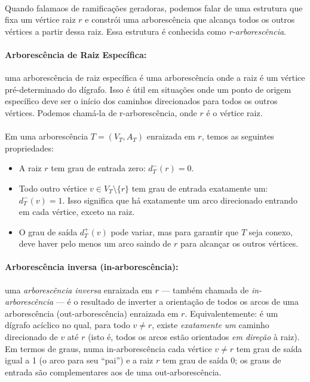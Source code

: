 \documentclass[12pt,a4paper]{article}
\begin{document}
\paragraph{}
Quando falamaos de ramificações geradoras, podemos falar de uma estrutura que fixa um vértice raiz \(r\) e constrói uma arborescência que alcança todos os outros vértices a partir dessa raiz. Essa estrutura é conhecida como \emph{r-arborescência}.

\paragraph{Arborescência de Raiz Específica:}
uma arborescência de raiz específica é uma arborescência onde a raiz é um vértice pré-determinado do dígrafo. Isso é útil em situações onde um ponto de origem específico deve ser o início dos caminhos direcionados para todos os outros vértices. Podemos chamá-la de r-arborescência, onde \(r\) é o vértice raiz.

\paragraph{}
Em uma arborescência \(T = (V_T, A_T)\) enraizada em \(r\), temos as seguintes propriedades:
\begin{itemize}
    \item A raiz \(r\) tem grau de entrada zero: \(d_T^-(r) = 0\).
    \item Todo outro vértice \(v \in V_T \setminus \{r\}\) tem grau de entrada exatamente um: \(d_T^-(v) = 1\). Isso significa que há exatamente um arco direcionado entrando em cada vértice, exceto na raiz.
    \item O grau de saída \(d_T^+(v)\) pode variar, mas para garantir que \(T\) seja conexo, deve haver pelo menos um arco saindo de \(r\) para alcançar os outros vértices.
\end{itemize}

\paragraph{Arborescência inversa (in-arborescência):}
uma \emph{arborescência inversa} enraizada em \(r\) — também chamada de \emph{in-arborescência} — é o resultado de inverter a orientação de todos os arcos de uma arborescência (out-arborescência) enraizada em \(r\). Equivalentemente: é um dígrafo acíclico no qual, para todo \(v\neq r\), existe \emph{exatamente um} caminho direcionado de \(v\) até \(r\) (isto é, todos os arcos estão orientados \emph{em direção} à raiz). Em termos de graus, numa in-arborescência cada vértice \(v\neq r\) tem grau de saída igual a 1 (o arco para seu “pai”) e a raiz \(r\) tem grau de saída 0; os graus de entrada são complementares aos de uma out-arborescência.
\end{document}
